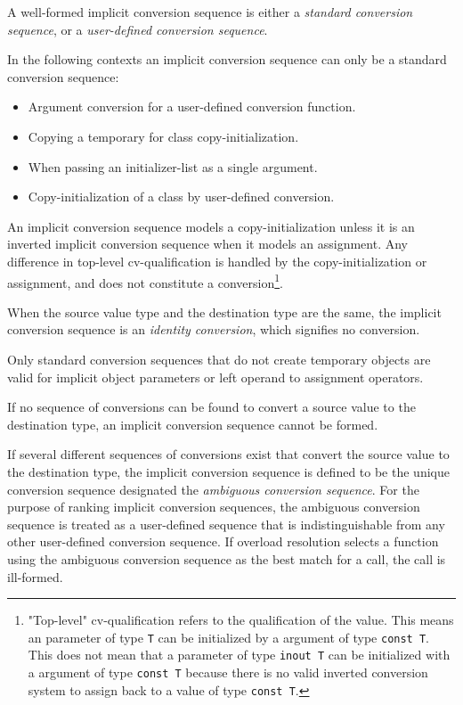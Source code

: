 \p A well-formed implicit conversion sequence is either a \textit{standard
conversion sequence}, or a \textit{user-defined conversion sequence}.

\p In the following contexts an implicit conversion sequence can only be a
standard conversion sequence:
\begin{itemize}
  \item Argument conversion for a user-defined conversion function.
  \item Copying a temporary for class copy-initialization.
  \item When passing an initializer-list as a single argument.
  \item Copy-initialization of a class by user-defined conversion.
\end{itemize}

\p An implicit conversion sequence models a copy-initialization unless it is an
inverted implicit conversion sequence when it models an assignment. Any
difference in top-level cv-qualification is handled by the copy-initialization
or assignment, and does not constitute a conversion\footnote{"Top-level"
cv-qualification refers to the qualification of the value. This means an
parameter of type \texttt{T} can be initialized by a argument of type
\texttt{const T}. This does not mean that a parameter of type \texttt{inout T}
can be initialized with a argument of type \texttt{const T} because there is no
valid inverted conversion system to assign back to a value of type \texttt{const
T}.}.

\p When the source value type and the destination type are the same, the
implicit conversion sequence is an \textit{identity conversion}, which signifies
no conversion.

\p Only standard conversion sequences that do not create temporary objects are
valid for implicit object parameters or left operand to assignment operators.

\p If no sequence of conversions can be found to convert a source value to the
destination type, an implicit conversion sequence cannot be formed.

\p If several different sequences of conversions exist that convert the source
value to the destination type, the implicit conversion sequence is defined to be
the unique conversion sequence designated the \textit{ambiguous conversion
sequence}. For the purpose of ranking implicit conversion sequences, the
ambiguous conversion sequence is treated as a user-defined sequence that is
indistinguishable from any other user-defined conversion sequence. If overload
resolution selects a function using the ambiguous conversion sequence as the
best match for a call, the call is ill-formed.

